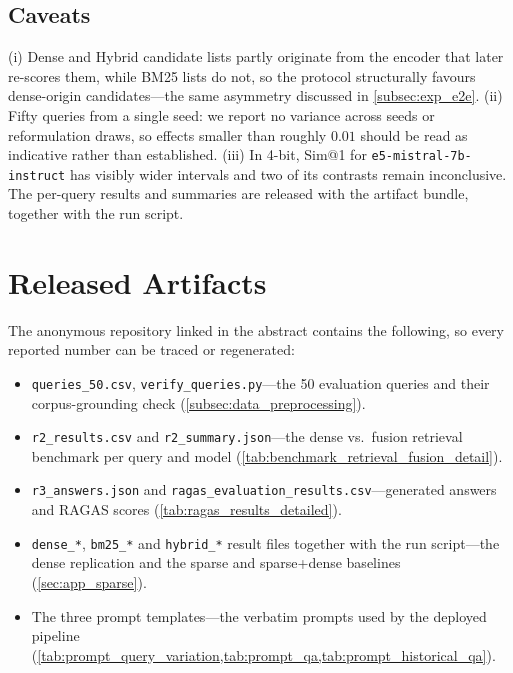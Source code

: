 \documentclass[11pt]{article}
\begin{document}
\subsection{Caveats}
(i) Dense and Hybrid candidate lists partly originate from the encoder that later re-scores them,
while BM25 lists do not, so the protocol structurally favours dense-origin candidates---the same
asymmetry discussed in \cref{subsec:exp_e2e}. (ii) Fifty queries from a single seed: we report no
variance across seeds or reformulation draws, so effects smaller than roughly \(0.01\) should be
read as indicative rather than established. (iii) In 4-bit, Sim@1 for \texttt{e5-mistral-7b-instruct}
has visibly wider intervals and two of its contrasts remain inconclusive. The per-query results and
summaries are released with the artifact bundle, together with the run script.

\section{Released Artifacts}
\label{sec:app_artifacts}

The anonymous repository linked in the abstract contains the following, so every reported number can be traced or regenerated:

\begin{itemize}
    \item \texttt{queries\_50.csv}, \texttt{verify\_queries.py}---the 50 evaluation queries and their corpus-grounding check (\cref{subsec:data_preprocessing}).
    \item \texttt{r2\_results.csv} and \texttt{r2\_summary.json}---the dense vs.\ fusion retrieval benchmark per query and model (\cref{tab:benchmark_retrieval_fusion_detail}).
    \item \texttt{r3\_answers.json} and \texttt{ragas\_evaluation\_results.csv}---generated answers and RAGAS scores (\cref{tab:ragas_results_detailed}).
    \item \texttt{dense\_*}, \texttt{bm25\_*} and \texttt{hybrid\_*} result files together with the run script---the dense replication and the sparse and sparse+dense baselines (\cref{sec:app_sparse}).
    \item The three prompt templates---the verbatim prompts used by the deployed pipeline (\cref{tab:prompt_query_variation,tab:prompt_qa,tab:prompt_historical_qa}).
\end{itemize}
\end{document}
